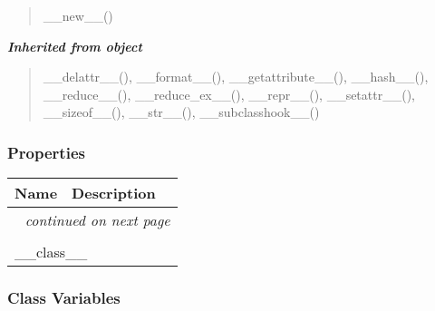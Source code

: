 \begin{quote}
\_\_new\_\_()
\end{quote}

\large{\textbf{\textit{Inherited from object}}}

\begin{quote}
\_\_delattr\_\_(), \_\_format\_\_(), \_\_getattribute\_\_(), \_\_hash\_\_(), \_\_reduce\_\_(), \_\_reduce\_ex\_\_(), \_\_repr\_\_(), \_\_setattr\_\_(), \_\_sizeof\_\_(), \_\_str\_\_(), \_\_subclasshook\_\_()
\end{quote}


  \subsubsection{Properties}

    \vspace{-1cm}
\hspace{\varindent}\begin{longtable}{|p{\varnamewidth}|p{\vardescrwidth}|l}
\cline{1-2}
\cline{1-2} \centering \textbf{Name} & \centering \textbf{Description}& \\
\cline{1-2}
\endhead\cline{1-2}\multicolumn{3}{r}{\small\textit{continued on next page}}\\\endfoot\cline{1-2}
\endlastfoot\multicolumn{2}{|l|}{\textit{Inherited from object}}\\
\multicolumn{2}{|p{\varwidth}|}{\raggedright \_\_class\_\_}\\
\cline{1-2}
\end{longtable}



  \subsubsection{Class Variables}

